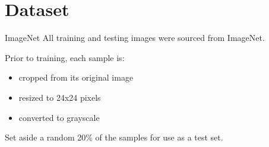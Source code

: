 \section{Dataset}
\begin{frame}{ImageNet \citep{imagenet_cvpr09}}
	All training and testing images were sourced from ImageNet.

	Prior to training, each sample is:
	\begin{itemize}
		\item cropped from its original image
		\item resized to 24x24 pixels
		\item converted to grayscale
	\end{itemize}

	Set aside a random 20\% of the samples for use as a test set.
\end{frame}

